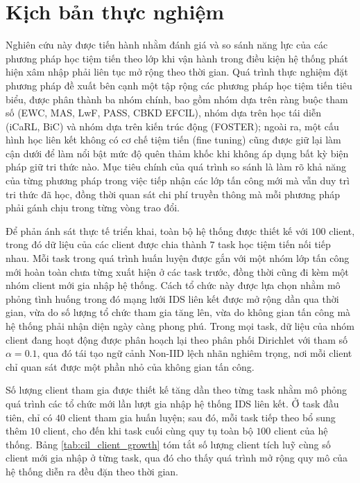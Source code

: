 \section{Kịch bản thực nghiệm}

Nghiên cứu này được tiến hành nhằm đánh giá và so sánh năng lực của các phương pháp học tiệm tiến theo lớp khi vận hành trong điều kiện hệ thống phát hiện xâm nhập phải liên tục mở rộng theo thời gian. Quá trình thực nghiệm đặt phương pháp đề xuất bên cạnh một tập rộng các phương pháp học tiệm tiến tiêu biểu, được phân thành ba nhóm chính, bao gồm nhóm dựa trên ràng buộc tham số (EWC, MAS, LwF, PASS, CBKD EFCIL), nhóm dựa trên học tái diễn (iCaRL, BiC) và nhóm dựa trên kiến trúc động (FOSTER); ngoài ra, một cấu hình học liên kết không có cơ chế tiệm tiến (fine tuning) cũng được giữ lại làm cận dưới để làm nổi bật mức độ quên thảm khốc khi không áp dụng bất kỳ biện pháp giữ tri thức nào. Mục tiêu chính của quá trình so sánh là làm rõ khả năng của từng phương pháp trong việc tiếp nhận các lớp tấn công mới mà vẫn duy trì tri thức đã học, đồng thời quan sát chi phí truyền thông mà mỗi phương pháp phải gánh chịu trong từng vòng trao đổi.

Để phản ánh sát thực tế triển khai, toàn bộ hệ thống được thiết kế với $100$ client, trong đó dữ liệu của các client được chia thành $7$ task học tiệm tiến nối tiếp nhau. Mỗi task trong quá trình huấn luyện được gắn với một nhóm lớp tấn công mới hoàn toàn chưa từng xuất hiện ở các task trước, đồng thời cũng đi kèm một nhóm client mới gia nhập hệ thống. Cách tổ chức này được lựa chọn nhằm mô phỏng tình huống trong đó mạng lưới IDS liên kết được mở rộng dần qua thời gian, vừa do số lượng tổ chức tham gia tăng lên, vừa do không gian tấn công mà hệ thống phải nhận diện ngày càng phong phú. Trong mọi task, dữ liệu của nhóm client đang hoạt động được phân hoạch lại theo phân phối Dirichlet với tham số $\alpha=0.1$, qua đó tái tạo ngữ cảnh Non-IID lệch nhãn nghiêm trọng, nơi mỗi client chỉ quan sát được một phần nhỏ của không gian tấn công.

Số lượng client tham gia được thiết kế tăng dần theo từng task nhằm mô phỏng quá trình các tổ chức mới lần lượt gia nhập hệ thống IDS liên kết. Ở task đầu tiên, chỉ có $40$ client tham gia huấn luyện; sau đó, mỗi task tiếp theo bổ sung thêm $10$ client, cho đến khi task cuối cùng quy tụ toàn bộ $100$ client của hệ thống. Bảng \ref{tab:cil_client_growth} tóm tắt số lượng client tích luỹ cùng số client mới gia nhập ở từng task, qua đó cho thấy quá trình mở rộng quy mô của hệ thống diễn ra đều đặn theo thời gian.

